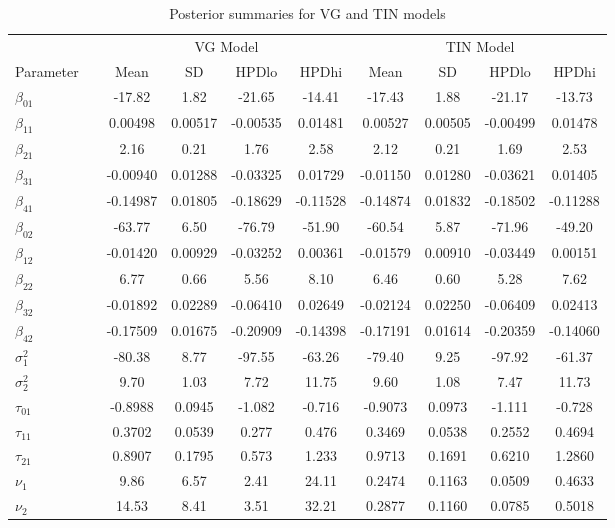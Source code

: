 \documentclass[10.5pt]{article} %
\begin{document}
\begin{table}[H]
\centering
\caption{Posterior summaries for VG and TIN models}
\begin{tabular}{llcccc|cccc}
\toprule
 & & \multicolumn{4}{c|}{VG Model} & \multicolumn{4}{c}{TIN Model} \\
Parameter & & Mean & SD & HPDlo & HPDhi & Mean & SD & HPDlo & HPDhi \\
\midrule
$\beta_{01}$ && -17.82 & 1.82 & -21.65 & -14.41 & -17.43 & 1.88 & -21.17 & -13.73 \\
$\beta_{11}$ && 0.00498 & 0.00517 & -0.00535 & 0.01481 & 0.00527 & 0.00505 & -0.00499 & 0.01478 \\
$\beta_{21}$ && 2.16 & 0.21 & 1.76 & 2.58 & 2.12 & 0.21 & 1.69 & 2.53 \\
$\beta_{31}$ && -0.00940 & 0.01288 & -0.03325 & 0.01729 & -0.01150 & 0.01280 & -0.03621 & 0.01405 \\
$\beta_{41}$ && -0.14987 & 0.01805 & -0.18629 & -0.11528 & -0.14874 & 0.01832 & -0.18502 & -0.11288 \\
$\beta_{02}$ && -63.77 & 6.50 & -76.79 & -51.90 & -60.54 & 5.87 & -71.96 & -49.20 \\
$\beta_{12}$ && -0.01420 & 0.00929 & -0.03252 & 0.00361 & -0.01579 & 0.00910 & -0.03449 & 0.00151 \\
$\beta_{22}$ && 6.77 & 0.66 & 5.56 & 8.10 & 6.46 & 0.60 & 5.28 & 7.62 \\
$\beta_{32}$ && -0.01892 & 0.02289 & -0.06410 & 0.02649 & -0.02124 & 0.02250 & -0.06409 & 0.02413 \\
$\beta_{42}$ && -0.17509 & 0.01675 & -0.20909 & -0.14398 & -0.17191 & 0.01614 & -0.20359 & -0.14060 \\
$\sigma^2_1$ && -80.38 & 8.77 & -97.55 & -63.26 & -79.40 & 9.25 & -97.92 & -61.37 \\
$\sigma^2_2$ && 9.70 & 1.03 & 7.72 & 11.75 & 9.60 & 1.08 & 7.47 & 11.73 \\
$\tau_{01}$ && -0.8988 & 0.0945 & -1.082 & -0.716 & -0.9073 & 0.0973 & -1.111 & -0.728 \\
$\tau_{11}$ && 0.3702 & 0.0539 & 0.277 & 0.476 & 0.3469 & 0.0538 & 0.2552 & 0.4694 \\
$\tau_{21}$ && 0.8907 & 0.1795 & 0.573 & 1.233 & 0.9713 & 0.1691 & 0.6210 & 1.2860 \\
$\nu_1$ && 9.86 & 6.57 & 2.41 & 24.11 & 0.2474 & 0.1163 & 0.0509 & 0.4633 \\
$\nu_2$ && 14.53 & 8.41 & 3.51 & 32.21 & 0.2877 & 0.1160 & 0.0785 & 0.5018 \\
\bottomrule
\end{tabular}
\end{table}
\end{document}
